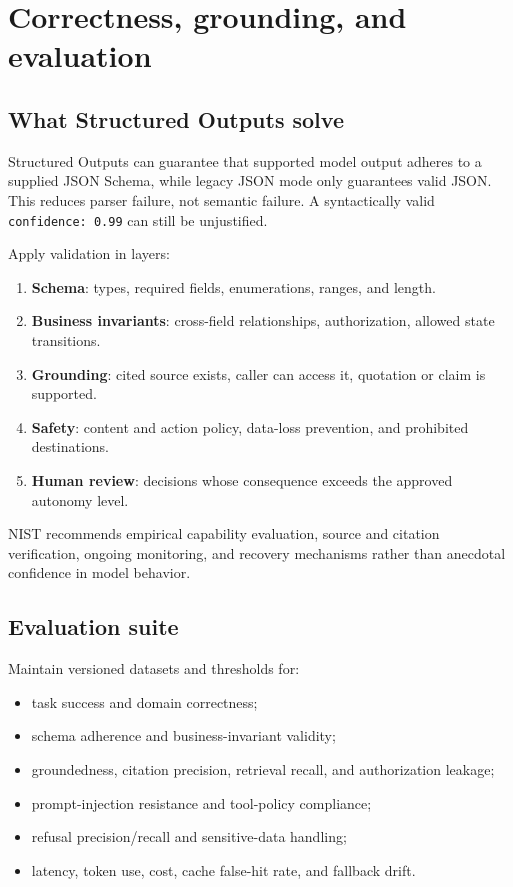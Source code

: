 \documentclass[10pt]{article}
\newcommand{\code}[1]{\texttt{#1}}
\begin{document}
\section{Correctness, grounding, and evaluation}

\subsection{What Structured Outputs solve}

Structured Outputs can guarantee that supported model output adheres to a supplied JSON Schema, while legacy JSON mode only guarantees valid JSON.\cite{openai-structured} This reduces parser failure, not semantic failure. A syntactically valid \code{confidence: 0.99} can still be unjustified.

Apply validation in layers:

\begin{enumerate}
  \item \textbf{Schema}: types, required fields, enumerations, ranges, and length.
  \item \textbf{Business invariants}: cross-field relationships, authorization, allowed state transitions.
  \item \textbf{Grounding}: cited source exists, caller can access it, quotation or claim is supported.
  \item \textbf{Safety}: content and action policy, data-loss prevention, and prohibited destinations.
  \item \textbf{Human review}: decisions whose consequence exceeds the approved autonomy level.
\end{enumerate}

NIST recommends empirical capability evaluation, source and citation verification, ongoing monitoring, and recovery mechanisms rather than anecdotal confidence in model behavior.\cite{nist-genai}

\subsection{Evaluation suite}

Maintain versioned datasets and thresholds for:

\begin{itemize}
  \item task success and domain correctness;
  \item schema adherence and business-invariant validity;
  \item groundedness, citation precision, retrieval recall, and authorization leakage;
  \item prompt-injection resistance and tool-policy compliance;
  \item refusal precision/recall and sensitive-data handling;
  \item latency, token use, cost, cache false-hit rate, and fallback drift.
\end{itemize}
\end{document}
